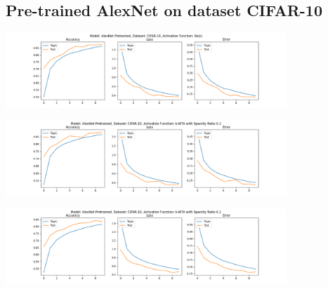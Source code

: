 \documentclass[a4paper]{article}
\begin{document}
		\subsection{Pre-trained AlexNet on dataset CIFAR-10}
			\begin{center}
				\centering
				\includegraphics[width=400px,keepaspectratio]{AlexNet_CIFAR-10_ReLU_Pretrained.png}
			\end{center}
			\begin{center}
				\centering
				\includegraphics[width=400px,keepaspectratio]{AlexNet_CIFAR-10_k-WTA_0.2_Pretrained.png}
			\end{center}
			\begin{center}
				\centering
				\includegraphics[width=400px,keepaspectratio]{AlexNet_CIFAR-10_k-WTA_0.1_Pretrained.png}
			\end{center}
		
\end{document}
